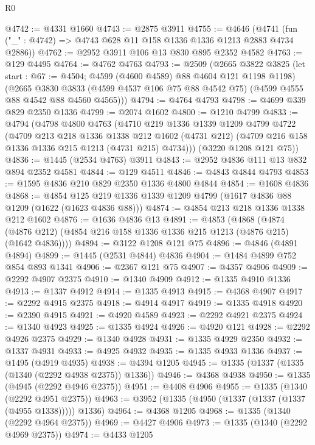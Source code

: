 \begin{lexlean}{R0}
\begin{coremodule}
@4742 := @4331 @1660
@4743 := @2875 @3911
@4755 := @4646
    (@4741 (fun ("_" : @4742) => @4743 @628 @11 @158 @1336 @1336 @1213 @2883 @4734 @2886))
@4762 := @2952 @3911 @106 @13 @830 @895 @2352 @4582
@4763 := @129 @4495
@4764 := @4762 @4763
@4793 := @2509
    (@2665
      @3822
      @3825
      (let start : @67 := @4504; @4599 (@4600 @4589) @88 @4604 @121 @1198 @1198)
      (@2665
        @3830
        @3833
        (@4599 @4537 @106 @75 @88 @4542 @75)
        (@4599 @4555 @88 @4542 @88 @4560 @4565)))
@4794 := @4764 @4793
@4798 := @4699 @339 @829 @2350 @1336
@4799 := @2074 @1602
@4800 := @1210 @4799
@4833 := @4794
    (@4798
      @4800
      @4763
      (@4710
        @219
        @1336
        @1339
        @1209
        @4799
        @4722
        (@4709
          @213
          @218
          @1336
          @1338
          @212
          @1602
          (@4731 @212)
          (@4709 @216 @158 @1336 @1336 @215 @1213 (@4731 @215) @4734)))
      (@3220 @1208 @121 @75))
@4836 := @1445 (@2534 @4763) @3911
@4843 := @2952 @4836 @111 @13 @832 @894 @2352 @4581
@4844 := @129 @4511
@4846 := @4843 @4844 @4793
@4853 := @1595 @4836 @210 @829 @2350 @1336 @4800 @4844
@4854 := @1608 @4836
@4868 := @4854 @125 @219 @1336 @1339 @1209 @4799 (@1617 @4836 @88 @1209 (@1622 (@1623 @4836 @88)))
@4874 := @4854 @213 @218 @1336 @1338 @212 @1602
@4876 := @1636 @4836 @13
@4891 := @4853
    (@4868 (@4874 (@4876 @212) (@4854 @216 @158 @1336 @1336 @215 @1213 (@4876 @215) (@1642 @4836))))
@4894 := @3122 @1208 @121 @75
@4896 := @4846 (@4891 @4894)
@4899 := @1445 (@2531 @4844) @4836
@4904 := @1484 @4899 @752 @854 @893 @1341
@4906 := @2367 @121 @75
@4907 := @4357 @4906
@4909 := @2292 @4907 @2375
@4910 := @1340 @4909
@4912 := @1335 @4910 @1336
@4913 := @1337 @4912
@4914 := @1335 @4913
@4915 := @4368 @4907
@4917 := @2292 @4915 @2375
@4918 := @4914 @4917
@4919 := @1335 @4918
@4920 := @2390 @4915
@4921 := @4920 @4589
@4923 := @2292 @4921 @2375
@4924 := @1340 @4923
@4925 := @1335 @4924
@4926 := @4920 @121
@4928 := @2292 @4926 @2375
@4929 := @1340 @4928
@4931 := @1335 @4929 @2350
@4932 := @1337 @4931
@4933 := @4925 @4932
@4935 := @1335 @4933 @1336
@4937 := @1495 (@4919 @4935)
@4938 := @4394 @1205
@4945 := @1335 (@1337 (@1335 (@1340 (@2292 @4938 @2375)) @1336))
@4946 := @4368 @4938
@4950 := @1335 (@4945 (@2292 @4946 @2375))
@4951 := @4408 @4906
@4955 := @1335 (@1340 (@2292 @4951 @2375))
@4963 := @3952 (@1335 (@4950 (@1337 (@1337 (@1337 (@4955 @1338))))) @1336)
@4964 := @4368 @1205
@4968 := @1335 (@1340 (@2292 @4964 @2375))
@4969 := @4427 @4906
@4973 := @1335 (@1340 (@2292 @4969 @2375))
@4974 := @4433 @1205

\end{coremodule}
\end{lexlean}
